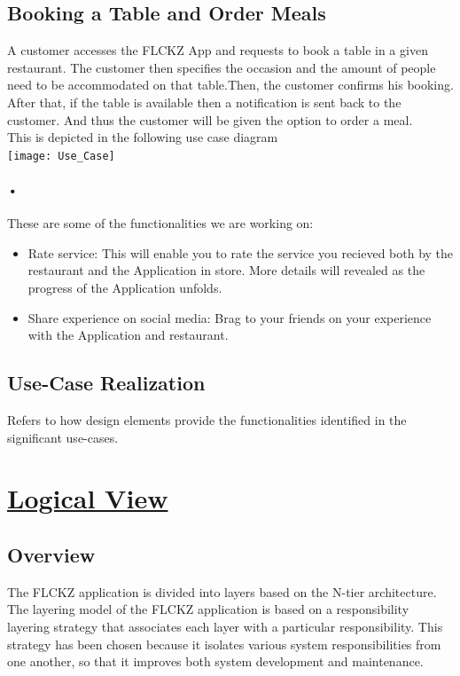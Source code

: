 \documentclass{article}
\begin{document}
\subsection{Booking a Table and Order Meals}
A customer accesses the FLCKZ App and requests to book a table in a given restaurant. The customer then specifies the occasion and the amount of people need to be accommodated on that table.Then, the customer confirms his booking. After that, if the table is available then a notification is sent back to the customer. And thus the customer will be given the option to order a meal.\\ This is depicted in the following use case diagram\\

\texttt{[image: Use\_Case]}
\paragraph{•}
These are some of the functionalities we are working on:
\begin{itemize}
\item Rate service: This will enable you to rate the service you recieved both by the restaurant and the Application in store. More details will revealed as the progress of the Application unfolds.
\item Share experience on social media: Brag to your friends on your experience with the Application and restaurant.
\end{itemize}

\subsection{Use-Case Realization}
Refers to how design elements provide the functionalities
identified in the significant use-cases.
\pagebreak
\section{\underline{Logical View}}
\subsection{Overview}
The FLCKZ application is divided into layers based on the N-tier architecture.
The layering model of the FLCKZ application is based on a responsibility
layering strategy that associates each layer with a particular responsibility. This
strategy has been chosen because it isolates various system responsibilities from
one another, so that it improves both system development and maintenance.
\end{document}
